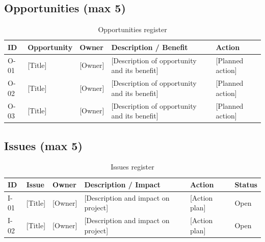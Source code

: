 \setlength{\tabcolsep}{6pt}

\subsection{Opportunities (max 5)}
\label{subsec:opportunities}

\begin{table}[H]
    \centering
    \caption{Opportunities register}
    \label{tab:opportunities}
    \begin{tabular}{C{0.7cm} L{3cm} L{2cm} L{5cm} L{3cm}}
        \toprule
        \textbf{ID} & \textbf{Opportunity} & \textbf{Owner} & \textbf{Description / Benefit} & \textbf{Action} \\
        \midrule
        O-01 & [Title] & [Owner] & [Description of opportunity and its benefit] & [Planned action] \\
        O-02 & [Title] & [Owner] & [Description of opportunity and its benefit] & [Planned action] \\
        O-03 & [Title] & [Owner] & [Description of opportunity and its benefit] & [Planned action] \\
        \bottomrule
    \end{tabular}
\end{table}

\subsection{Issues (max 5)}
\label{subsec:issues}

\begin{table}[H]
    \centering
    \caption{Issues register}
    \label{tab:issues}
    \begin{tabular}{C{0.7cm} L{3cm} L{2cm} L{4cm} L{3cm} L{1.5cm}}
        \toprule
        \textbf{ID} & \textbf{Issue} & \textbf{Owner} & \textbf{Description / Impact} & \textbf{Action} & \textbf{Status} \\
        \midrule
        I-01 & [Title] & [Owner] & [Description and impact on project] & [Action plan] & Open \\
        I-02 & [Title] & [Owner] & [Description and impact on project] & [Action plan] & Open \\
        \bottomrule
    \end{tabular}
\end{table}
